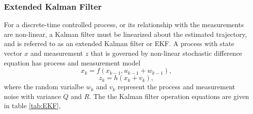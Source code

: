 
\subsubsection{Extended Kalman Filter}
For a discrete-time controlled process, or its relationship with the
measurements are non-linear, a Kalman filter must be linearized about
the estimated trajectory, and is referred to as an extended Kalman
filter or EKF. A process with state vector $x$ and measurement $z$
that is governed by non-linear stochastic difference equation has
process and measurement model 
\begin{equation}
x_k=f(x_{k-1}, u_{k-1}+w_{k-1}),
\end{equation}
\begin{equation}
z_k=h(x_k+v_k),
\end{equation}
\noindent where the random varialbe $w_k$ and $v_k$ represent the
process and measurement noise with variance $Q$ and $R$. The the
Kalman filter operation equations are given in table
\ref{tab:EKF},

\FloatBarrier

